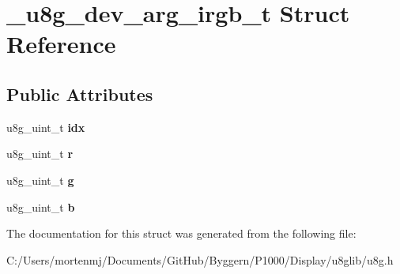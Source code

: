 \hypertarget{struct__u8g__dev__arg__irgb__t}{\section{\-\_\-u8g\-\_\-dev\-\_\-arg\-\_\-irgb\-\_\-t Struct Reference}
\label{struct__u8g__dev__arg__irgb__t}
}
\subsection*{Public Attributes}
\begin{DoxyCompactItemize}
\item 
\hypertarget{struct__u8g__dev__arg__irgb__t_a0e3cc0e7e3a8ccc73f5e6e4265c788d5}{u8g\-\_\-uint\-\_\-t {\bfseries idx}}\label{struct__u8g__dev__arg__irgb__t_a0e3cc0e7e3a8ccc73f5e6e4265c788d5}

\item 
\hypertarget{struct__u8g__dev__arg__irgb__t_aafb5cea4c15476dbf54433495d14d528}{u8g\-\_\-uint\-\_\-t {\bfseries r}}\label{struct__u8g__dev__arg__irgb__t_aafb5cea4c15476dbf54433495d14d528}

\item 
\hypertarget{struct__u8g__dev__arg__irgb__t_a5abb3f1e663a9fcceb585a4c2fbf9e5a}{u8g\-\_\-uint\-\_\-t {\bfseries g}}\label{struct__u8g__dev__arg__irgb__t_a5abb3f1e663a9fcceb585a4c2fbf9e5a}

\item 
\hypertarget{struct__u8g__dev__arg__irgb__t_a93e46b405ebcfb1e847e90002584b322}{u8g\-\_\-uint\-\_\-t {\bfseries b}}\label{struct__u8g__dev__arg__irgb__t_a93e46b405ebcfb1e847e90002584b322}

\end{DoxyCompactItemize}


The documentation for this struct was generated from the following file\-:\begin{DoxyCompactItemize}
\item 
C\-:/\-Users/mortenmj/\-Documents/\-Git\-Hub/\-Byggern/\-P1000/\-Display/u8glib/u8g.\-h\end{DoxyCompactItemize}
